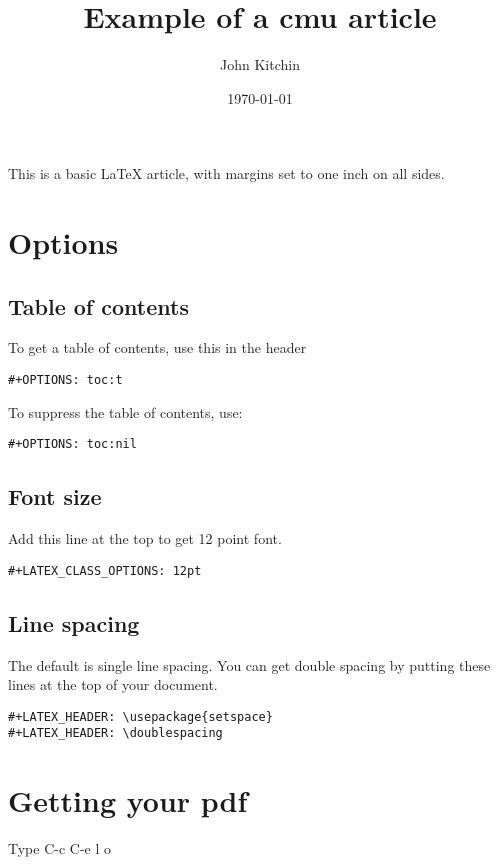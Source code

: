 \documentclass[12pt]{article}
\author{John Kitchin}
\date{\today}
\title{Example of a cmu article}
\begin{document}
\maketitle
\tableofcontents

This is a basic \LaTeX{} article, with margins set to one inch on all sides.

\section{Options}
\label{sec-1}

\subsection{Table of contents}
\label{sec-1-1}

To get a table of contents, use this in the header

\begin{verbatim}
#+OPTIONS: toc:t
\end{verbatim}

To suppress the table of contents, use:

\begin{verbatim}
#+OPTIONS: toc:nil
\end{verbatim}
\subsection{Font size}
\label{sec-1-2}
Add this line at the top to get 12 point font.

\begin{verbatim}
#+LATEX_CLASS_OPTIONS: 12pt
\end{verbatim}
\subsection{Line spacing}
\label{sec-1-3}

The default is single line spacing. You can get double spacing by putting these lines at the top of your document.

\begin{verbatim}
#+LATEX_HEADER: \usepackage{setspace}
#+LATEX_HEADER: \doublespacing
\end{verbatim}
\section{Getting your pdf}
\label{sec-2}

Type C-c C-e l o
\end{document}
